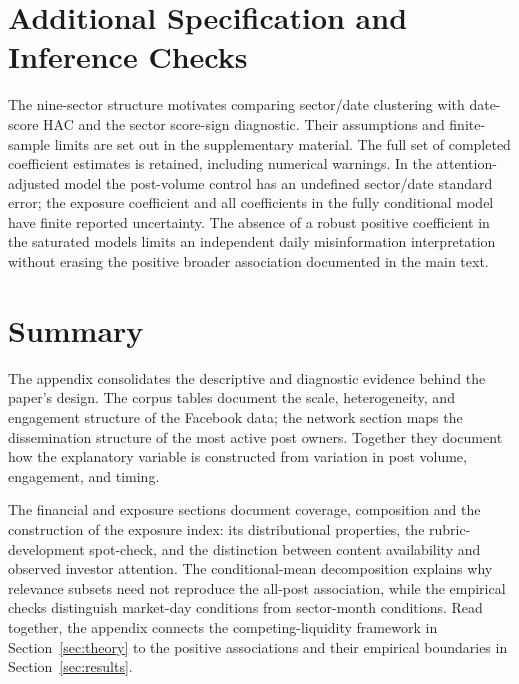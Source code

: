 \documentclass{article}
\theoremstyle{plain}
\begin{document}
\FloatBarrier
\section{Additional Specification and Inference Checks}
\label{sec:appendix_robustness}




The nine-sector structure motivates comparing sector/date clustering with date-score HAC and the sector score-sign diagnostic. Their assumptions and finite-sample limits are set out in the supplementary material. The full set of completed coefficient estimates is retained, including numerical warnings. In the attention-adjusted model the post-volume control has an undefined sector/date standard error; the exposure coefficient and all coefficients in the fully conditional model have finite reported uncertainty. The absence of a robust positive coefficient in the saturated models limits an independent daily misinformation interpretation without erasing the positive broader association documented in the main text.

\FloatBarrier
\section{Summary}

The appendix consolidates the descriptive and diagnostic evidence behind the paper's design. The corpus tables document the scale, heterogeneity, and engagement structure of the Facebook data; the network section maps the dissemination structure of the most active post owners. Together they document how the explanatory variable is constructed from variation in post volume, engagement, and timing.

The financial and exposure sections document coverage, composition and the construction of the exposure index: its distributional properties, the rubric-development spot-check, and the distinction between content availability and observed investor attention. The conditional-mean decomposition explains why relevance subsets need not reproduce the all-post association, while the empirical checks distinguish market-day conditions from sector-month conditions. Read together, the appendix connects the competing-liquidity framework in Section~\ref{sec:theory} to the positive associations and their empirical boundaries in Section~\ref{sec:results}.
\end{document}
